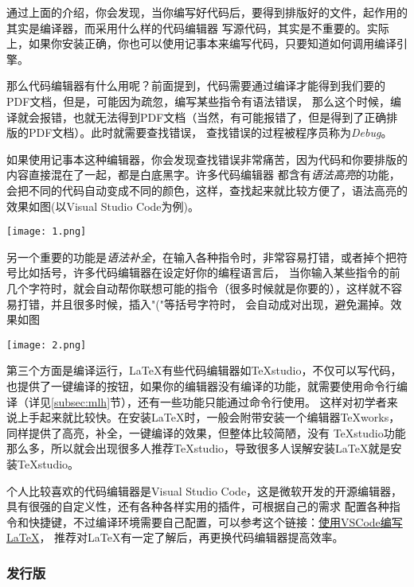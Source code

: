 通过上面的介绍，你会发现，当你编写好代码后，要得到排版好的文件，起作用的其实是编译器，而采用什么样的代码编辑器
写源代码，其实是不重要的。实际上，如果你安装正确，你也可以使用记事本来编写代码，只要知道如何调用编译引擎。

那么代码编辑器有什么用呢？前面提到，代码需要通过编译才能得到我们要的PDF文档，但是，可能因为疏忽，编写某些指令有语法错误，
那么这个时候，编译就会报错，也就无法得到PDF文档（当然，有可能报错了，但是得到了正确排版的PDF文档）。此时就需要查找错误，
查找错误的过程被程序员称为\emph{Debug}。

如果使用记事本这种编辑器，你会发现查找错误非常痛苦，因为代码和你要排版的内容直接混在了一起，都是白底黑字。许多代码编辑器
都含有\emph{语法高亮}的功能，会把不同的代码自动变成不同的颜色，这样，查找起来就比较方便了，语法高亮的效果如图(以Visual Studio Code为例)。
\begin{center}
  \texttt{[image: 1.png]}
\end{center}

另一个重要的功能是\emph{语法补全}，在输入各种指令时，非常容易打错，或者掉个把符号比如括号，许多代码编辑器在设定好你的编程语言后，
当你输入某些指令的前几个字符时，就会自动帮你联想可能的指令（很多时候就是你要的），这样就不容易打错，并且很多时候，插入"("等括号字符时，
会自动成对出现，避免漏掉。效果如图
\begin{center}
  \texttt{[image: 2.png]}
\end{center}

第三个方面是编译运行，\LaTeX{}有些代码编辑器如TeXstudio，不仅可以写代码，也提供了一键编译的按钮，如果你的编辑器没有编译的功能，就需要使用命令行编译（详见\ref{subsec:mlh}节），还有一些功能只能通过命令行使用。
这样对初学者来说上手起来就比较快。在安装\LaTeX{}时，一般会附带安装一个编辑器TeXworks，同样提供了高亮，补全，一键编译的效果，但整体比较简陋，没有
TeXstudio功能那么多，所以就会出现很多人推荐TeXstudio，导致很多人误解安装\LaTeX{}就是安装TeXstudio。

个人比较喜欢的代码编辑器是Visual Studio Code，这是微软开发的开源编辑器，具有很强的自定义性，还有各种各样实用的插件，可根据自己的需求
配置各种指令和快捷键，不过编译环境需要自己配置，可以参考这个链接：\href{https://zhuanlan.zhihu.com/p/38178015?utm_source=qq&utm_medium=social&utm_oi=1122597840500740096}{使用VSCode编写LaTeX}，
推荐对\LaTeX{}有一定了解后，再更换代码编辑器提高效率。



\subsubsection{发行版}


